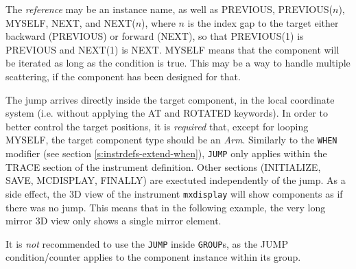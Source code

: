The \textit{reference} may be an instance name, as well as PREVIOUS, PREVIOUS($n$), MYSELF, NEXT, and NEXT($n$), where $n$ is the index gap to the target either backward (PREVIOUS) or forward (NEXT), so that PREVIOUS(1) is PREVIOUS and NEXT(1) is NEXT. MYSELF means that the component will be iterated as long as the condition is true. This may be a way to handle multiple scattering, if the component has been designed for that.

The jump arrives directly inside the target component, in the local coordinate system (i.e. without applying the AT and ROTATED keywords). In order to better control the target
positions, it is \emph{required} that, except for looping MYSELF, the target component type should be an \emph{Arm}.
%
%
%
%
%
%
Similarly to the \texttt{WHEN} modifier (see section \ref{s:instrdefs-extend-when}), \texttt{JUMP} only applies within the TRACE section of the instrument definition. Other
sections (INITIALIZE, SAVE, MCDISPLAY, FINALLY) are exectuted independently of the jump. As a side effect, the 3D view of the instrument \texttt{mxdisplay} will show components as if
there was no jump. This means that in the following example, the very long mirror 3D view only shows a single mirror element.

It is \emph{not} recommended to use the \verb+JUMP+ inside \verb+GROUP+s, as the JUMP condition/counter applies to the component instance within its group.

